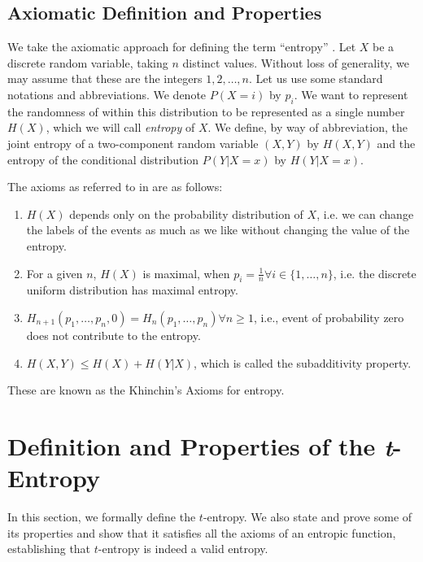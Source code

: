 \documentclass{article}
\begin{document}
\subsection{Axiomatic Definition and Properties}\label{axiom}
We take the axiomatic approach for defining the term ``entropy'' \citep{khinchin2013mathematical}. Let $X$ be a discrete random variable, taking $n$ distinct values. Without loss of generality, we may assume that these are the integers $1, 2,\dots, n$. Let us use some standard notations and abbreviations. We denote $P(X=i)$ by $p_i$. We want to represent the randomness of within this distribution to be represented as a single number $H(X)$, which we will call \textit{entropy} of $X$. We define, by way of abbreviation, the joint entropy of a two-component random variable $(X,Y)$ by $H(X,Y)$ and the entropy of the conditional distribution $P(Y|X=x)$ by $H(Y|X=x)$.
\par
The axioms as referred to in \citep{khinchin2013mathematical,nambiar1992axiomatic,chakrabarti2005shannon} are as follows:
\begin{enumerate}
    \item $H(X)$ depends only on the probability distribution of $X$, i.e. we can
change the labels of the events as much as we like without changing the value of the entropy.
    \item For a given $n$, $H(X)$ is maximal, when $p_i=\frac{1}{n}\forall i\in \{1,\dots,n\}$, i.e. the discrete uniform distribution has maximal entropy.
    \item $H_{n+1}(p_1,\dots,p_n,0)=H_{n}(p_1,\dots,p_n) \forall n\geq 1$, i.e., event of probability zero does not contribute to the entropy.
    \item $H(X,Y)\leq H(X)+H(Y|X)$, which is called the subadditivity property. 
\end{enumerate}
These are known as the Khinchin's Axioms \citep{khinchin2013mathematical,suyari2004generalization} for entropy. 

\section{Definition and Properties of the \textit{t}-Entropy}
\label{S2}
In this section, we formally define the $t$-entropy. We also state and prove some of its properties and show that it satisfies all the axioms of an entropic function, establishing that $t$-entropy is indeed a valid entropy.
\end{document}
